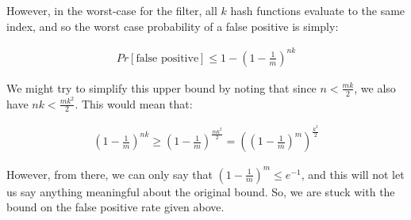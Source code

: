 \documentclass[fleqn]{homework}
\begin{document}
\begin{problem}{2}
    However, in the worst-case for the filter, all $k$ hash functions evaluate
    to the same index, and so the worst case probability of a false positive is
    simply:

    \begin{align*}
      Pr[\text{false positive}] \le 1 - \left(1 - \frac{1}{m}\right)^{nk}
    \end{align*}

    We might try to simplify this upper bound by noting that since
    $n < \frac{mk}{2}$, we also have $nk < \frac{mk^2}{2}$.  This would mean
    that:

    \begin{align*}
      \left(1 - \frac{1}{m}\right)^{nk} \ge 
      \left(1 - \frac{1}{m}\right)^{\frac{mk^2}{2}} = 
      \left(\left(1 - \frac{1}{m}\right)^m\right)^{\frac{k^2}{2}}
    \end{align*}

    However, from there, we can only say that
    $\left(1 - \frac{1}{m}\right)^m \le e^{-1}$, and this will not let us say
    anything meaningful about the original bound.  So, we are stuck with the
    bound on the false positive rate given above.
  \end{problem}
\end{document}
